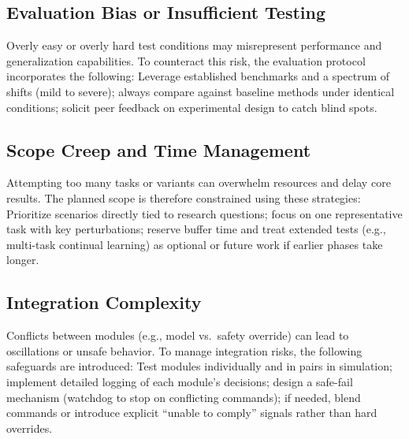 \subsection{Evaluation Bias or Insufficient Testing}
Overly easy or overly hard test conditions may misrepresent performance and generalization capabilities. To counteract this risk, the evaluation protocol incorporates the following: Leverage established benchmarks and a spectrum of shifts (mild to severe); always compare against baseline methods under identical conditions; solicit peer feedback on experimental design to catch blind spots.

\subsection{Scope Creep and Time Management}
Attempting too many tasks or variants can overwhelm resources and delay core results. The planned scope is therefore constrained using these strategies: Prioritize scenarios directly tied to research questions; focus on one representative task with key perturbations; reserve buffer time and treat extended tests (e.g., multi-task continual learning) as optional or future work if earlier phases take longer.

\subsection{Integration Complexity}
Conflicts between modules (e.g., model vs.\ safety override) can lead to oscillations or unsafe behavior. To manage integration risks, the following safeguards are introduced: Test modules individually and in pairs in simulation; implement detailed logging of each module’s decisions; design a safe-fail mechanism (watchdog to stop on conflicting commands); if needed, blend commands or introduce explicit ``unable to comply'' signals rather than hard overrides.

